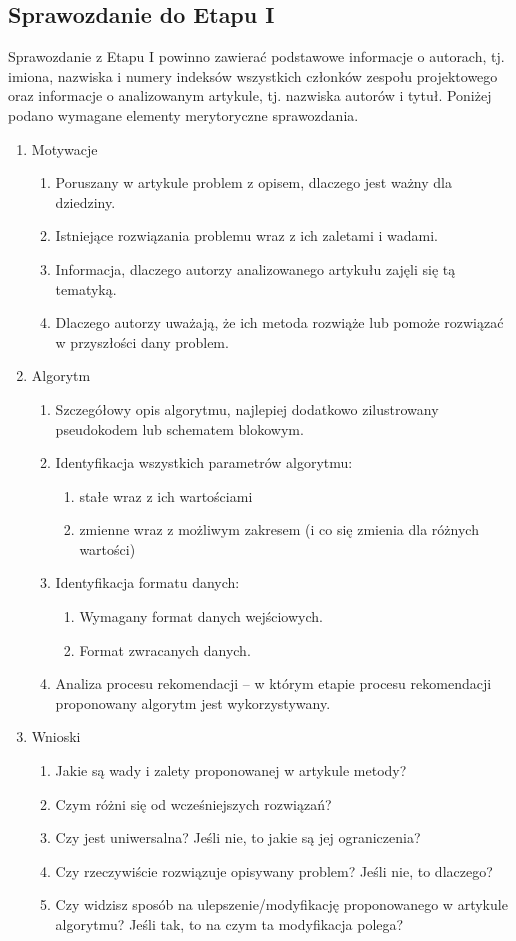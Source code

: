 \documentclass[a4paper]{LTJournalArticle}
\begin{document}
	\subsection{Sprawozdanie do Etapu I}
	Sprawozdanie z Etapu I powinno zawierać podstawowe informacje
	o autorach, tj. imiona, nazwiska i numery indeksów wszystkich członków
	zespołu projektowego oraz informacje o analizowanym artykule, tj. nazwiska
	autorów i tytuł. 
	Poniżej podano wymagane elementy merytoryczne sprawozdania.
	\begin{enumerate}
		\item Motywacje
		\begin{enumerate}
			\item Poruszany w artykule problem z opisem, dlaczego jest ważny dla dziedziny.
			\item Istniejące rozwiązania problemu wraz z ich zaletami i wadami.
			\item Informacja, dlaczego autorzy analizowanego artykułu zajęli się tą tematyką.
			\item Dlaczego autorzy uważają, że ich metoda rozwiąże lub pomoże rozwiązać w przyszłości dany problem.
		\end{enumerate}
		\item Algorytm
		\begin{enumerate}
			\item Szczegółowy opis algorytmu, najlepiej dodatkowo zilustrowany pseudokodem lub schematem blokowym.
			\item Identyfikacja wszystkich parametrów algorytmu:
			\begin{enumerate}
				\item stałe wraz z ich wartościami
				\item zmienne wraz z możliwym zakresem (i co się zmienia dla różnych wartości)
			\end{enumerate}
			\item Identyfikacja formatu danych:
			\begin{enumerate}
				\item Wymagany format danych wejściowych.
				\item Format zwracanych danych.
			\end{enumerate}
			\item Analiza procesu rekomendacji – w którym etapie procesu rekomendacji proponowany algorytm jest wykorzystywany.
		\end{enumerate}
		\item Wnioski
		\begin{enumerate}
			\item Jakie są wady i zalety proponowanej w artykule metody?
			\item Czym różni się od wcześniejszych rozwiązań?
			\item Czy jest uniwersalna? Jeśli nie, to jakie są jej ograniczenia?
			\item Czy rzeczywiście rozwiązuje opisywany problem? Jeśli nie, to dlaczego?
			\item Czy widzisz sposób na ulepszenie/modyfikację proponowanego w artykule algorytmu? Jeśli tak, to na czym ta modyfikacja polega?
		\end{enumerate}
	\end{enumerate}
\end{document}
